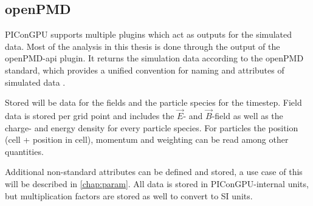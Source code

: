 \documentclass[bachelor_thesis]{subfiles}
\begin{document}
\subsection{openPMD}
PIConGPU supports multiple plugins which act as outputs for the simulated data. Most of the analysis in this thesis is done through the output of the openPMD-api \cite{openPMDAPI} plugin.
It returns the simulation data according to the openPMD standard, which provides a unified convention for naming and attributes of simulated data \cite{openPMDstandard}.

Stored will be data for the fields and the particle species for the timestep. Field data is stored per grid point and includes the $\vec{E}$- and $\vec{B}$-field as well as the charge- and energy density for every particle species.
For particles the position (cell + position in cell), momentum and weighting can be read among other quantities. 

Additional non-standard attributes can be defined and stored, a use case of this will be described in \autoref{chap:param}. All data is stored in PIConGPU-internal units, but multiplication factors are stored as well to convert to SI units.
\end{document}
